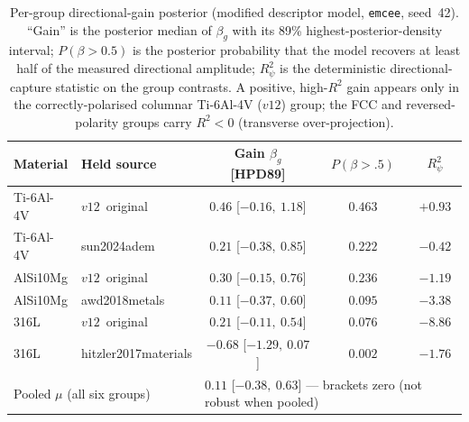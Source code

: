 \documentclass[11pt,a4paper,twocolumn]{article}
\begin{document}
\begin{table}[tp]
\centering
\caption{Per-group directional-gain posterior (modified descriptor model, \texttt{emcee}, seed~42). ``Gain'' is the posterior median of $\beta_g$ with its 89\% highest-posterior-density interval; $P(\beta>0.5)$ is the posterior probability that the model recovers at least half of the measured directional amplitude; $R^2_{\psi}$ is the deterministic directional-capture statistic on the group contrasts. A positive, high-$R^2$ gain appears only in the correctly-polarised columnar Ti-6Al-4V ($v12$) group; the FCC and reversed-polarity groups carry $R^2<0$ (transverse over-projection).}
\label{tab:si_dirgain}
\footnotesize
\setlength{\tabcolsep}{4pt}
\begin{tabular}{ll ccc}
\toprule
\textbf{Material} & \textbf{Held source} & \textbf{Gain $\beta_g$ [HPD89]} & $P(\beta\!>\!.5)$ & $R^2_{\psi}$ \\
\midrule
Ti-6Al-4V & $v12$~original      & $0.46$ [$-0.16,\ 1.18$]   & $0.463$ & $+0.93$ \\
Ti-6Al-4V & sun2024adem         & $0.21$ [$-0.38,\ 0.85$]   & $0.222$ & $-0.42$ \\
AlSi10Mg  & $v12$~original      & $0.30$ [$-0.15,\ 0.76$]   & $0.236$ & $-1.19$ \\
AlSi10Mg  & awd2018metals       & $0.11$ [$-0.37,\ 0.60$]   & $0.095$ & $-3.38$ \\
316L      & $v12$~original      & $0.21$ [$-0.11,\ 0.54$]   & $0.076$ & $-8.86$ \\
316L      & hitzler2017materials& $-0.68$ [$-1.29,\ 0.07$]  & $0.002$ & $-1.76$ \\
\midrule
\multicolumn{2}{l}{Pooled $\mu$ (all six groups)} & \multicolumn{3}{l}{$0.11$ [$-0.38,\ 0.63$] --- brackets zero (not robust when pooled)} \\
\bottomrule
\end{tabular}
\end{table}
\end{document}
